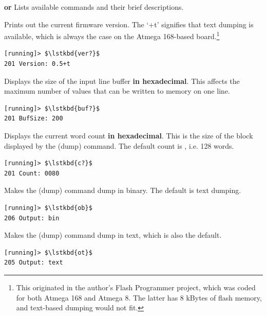 \begin{description}
\item{\bfseries{} or } Lists available commands and their
  brief descriptions.

\item{\bfseries{}} Prints out the current firmware version. The ‘+t’
  signifies that text dumping is available, which is always the case
  on the Atmega 168-based board.\footnote{This originated in the
    author's Flash Programmer project, which was coded for both
    Atmega 168 and Atmega 8. The latter has 8 kBytes of flash
    memory, and text-based dumping would not fit.}

{\small
\begin{lstlisting}[style=deb]
[running]> $\lstkbd{ver?}$
201 Version: 0.5+t
\end{lstlisting}
}

\item{\bfseries{}} Displays the size of the input line buffer {\bfseries
  in hexadecimal}. This affects the maximum number of values that can
  be written to memory on one line.

{\small
\begin{lstlisting}[style=deb]
[running]> $\lstkbd{buf?}$
201 BufSize: 200
\end{lstlisting}
}

\item{\bfseries{}} Displays the current word count {\bfseries in
  hexadecimal}. This is the size of the block displayed by the 
  (dump) command. The default count is , i.e. 128 words.

{\small
\begin{lstlisting}[style=deb]
[running]> $\lstkbd{c?}$
201 Count: 0080
\end{lstlisting}
}

\item{\bfseries{}} Makes the 
  (dump) command dump in binary. The default is text dumping.

{\small
\begin{lstlisting}[style=deb]
[running]> $\lstkbd{ob}$
206 Output: bin
\end{lstlisting}
}

\item{\bfseries{}} Makes the 
  (dump) command dump in text, which is also the default.

{\small
\begin{lstlisting}[style=deb]
[running]> $\lstkbd{ot}$
205 Output: text
\end{lstlisting}
}


\end{description}
